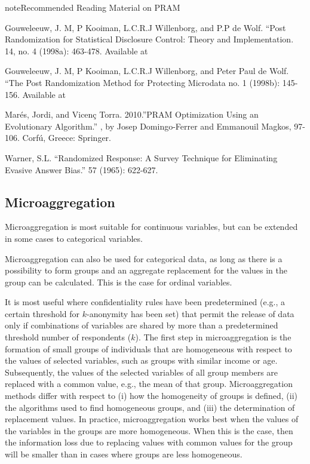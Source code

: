 \documentclass[letterpaper,10pt,english]{sphinxmanual}
\begin{document}
\begin{sphinxadmonition}{note}{Recommended Reading Material on PRAM}

Gouweleeuw, J. M, P Kooiman, L.C.R.J Willenborg, and P.P de Wolf. “Post
Randomization for Statistical Disclosure Control: Theory and
Implementation. 14, no. 4 (1998a):
463-478. Available at

Gouweleeuw, J. M, P Kooiman, L.C.R.J Willenborg, and Peter Paul de Wolf.
“The Post Randomization Method for Protecting Microdata no. 1 (1998b):
145-156. Available at

Marés, Jordi, and Vicenç Torra. 2010.”PRAM Optimization Using an
Evolutionary Algorithm.” , by Josep
Domingo-Ferrer and Emmanouil Magkos, 97-106. Corfú, Greece: Springer.

Warner, S.L. “Randomized Response: A Survey Technique for Eliminating
Evasive Answer Bias.”  57
(1965): 622-627.
\end{sphinxadmonition}


\subsection{Microaggregation}
\label{\detokenize{anon_methods:id13}}
Microaggregation is most suitable for continuous variables, but can be
extended in some cases to categorical variables. %
\begin{footnote}[14]\sphinxAtStartFootnote
Microaggregation can also be used for categorical data, as long as
there is a possibility to form groups and an aggregate replacement
for the values in the group can be calculated. This is the case for
ordinal variables.
%
\end{footnote}
It is most useful where confidentiality rules have been predetermined
(e.g., a certain threshold for \(k\)-anonymity has been set) that
permit the release of data only if combinations of variables are shared
by more than a predetermined threshold number of respondents
(\(k\)). The first step in microaggregation is the formation of
small groups of individuals that are homogeneous with respect to the
values of selected variables, such as groups with similar income or age.
Subsequently, the values of the selected variables of all group members
are replaced with a common value, e.g., the mean of that group.
Microaggregation methods differ with respect to (i) how the homogeneity
of groups is defined, (ii) the algorithms used to find homogeneous
groups, and (iii) the determination of replacement values. In practice,
microaggregation works best when the values of the variables in the
groups are more homogeneous. When this is the case, then the information
loss due to replacing values with common values for the group will be
smaller than in cases where groups are less homogeneous.
\end{document}
